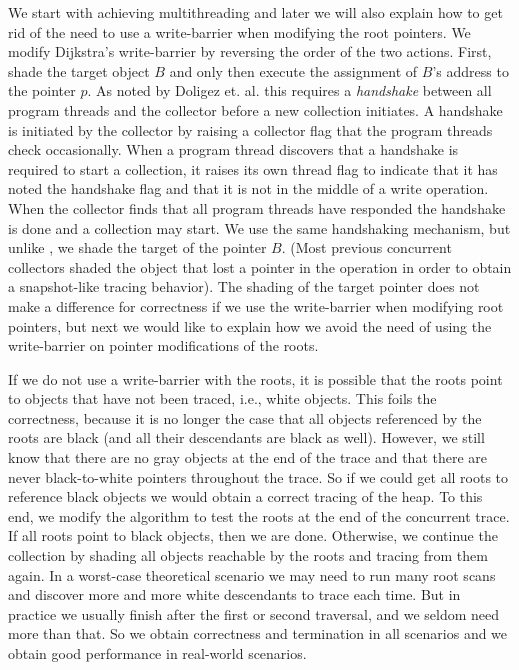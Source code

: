 We start with achieving multithreading and later we will also explain how to get rid of the need to use a write-barrier when modifying the root pointers. We modify Dijkstra's write-barrier by reversing the order of the two actions. First, shade the target object $B$ and only then execute the assignment of $B$'s address to the pointer $p$. As noted by Doligez et. al. \cite{doli93,doli94} this requires a {\em handshake} between all program threads and the collector before a new collection initiates. A handshake is initiated by the collector by raising a collector flag that the program threads check occasionally. When a program thread discovers that a handshake is required to start a collection, it raises its own thread flag to indicate that it has noted the handshake flag and that it is not in the middle of a write operation. When the collector finds that all program threads have responded the handshake is done and a collection may start. We use the same handshaking mechanism, but unlike \cite{doli93,doli94}, we shade the target of the pointer $B$. (Most previous  concurrent collectors shaded the object that lost a pointer in the operation in order to obtain a snapshot-like tracing behavior). The shading of the target pointer does not make a difference for
correctness if we use the write-barrier when modifying root pointers, but next we would like to explain how we avoid the need of using the write-barrier on pointer modifications of the roots. 

If we do not use a write-barrier with the roots, it is possible that the roots point to objects that have not been traced, i.e., white objects. This foils the correctness, because it is no longer the case that all objects referenced by the roots are black (and all their descendants are black as well). However, we still know that there are no gray objects at the end of the trace and that there are never black-to-white pointers throughout the trace. So if we could get all roots to reference black objects we would obtain a correct tracing of the heap. To this end, we modify the algorithm to test the roots at the end of the concurrent trace. If all roots point to black objects, then we are done. Otherwise, we continue the collection by shading all objects reachable by the roots and tracing from them again. 
In a worst-case theoretical scenario we may need to run many root scans and discover more and more white descendants to trace each time. 
But in practice we usually finish after the first or second traversal, and we seldom need more than that. So we obtain correctness and termination in all scenarios and we obtain good performance in real-world scenarios. 







